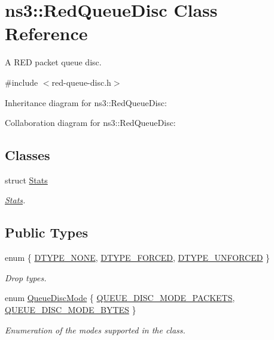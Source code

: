 \hypertarget{classns3_1_1RedQueueDisc}{}\section{ns3\+:\+:Red\+Queue\+Disc Class Reference}
\label{classns3_1_1RedQueueDisc}


A R\+ED packet queue disc.  




{\ttfamily \#include $<$red-\/queue-\/disc.\+h$>$}



Inheritance diagram for ns3\+:\+:Red\+Queue\+Disc\+:


Collaboration diagram for ns3\+:\+:Red\+Queue\+Disc\+:
\subsection*{Classes}
\begin{DoxyCompactItemize}
\item 
struct \hyperlink{structns3_1_1RedQueueDisc_1_1Stats}{Stats}
\begin{DoxyCompactList}\small\item\em \hyperlink{structns3_1_1RedQueueDisc_1_1Stats}{Stats}. \end{DoxyCompactList}\end{DoxyCompactItemize}
\subsection*{Public Types}
\begin{DoxyCompactItemize}
\item 
enum \{ \hyperlink{classns3_1_1RedQueueDisc_a9599a29f6ed3cfc742e7b1c6acd81b0ca875c18e83b2c08e443231f98a46f104c}{D\+T\+Y\+P\+E\+\_\+\+N\+O\+NE}, 
\hyperlink{classns3_1_1RedQueueDisc_a9599a29f6ed3cfc742e7b1c6acd81b0ca65211b6708c279be68d252f83012f2a9}{D\+T\+Y\+P\+E\+\_\+\+F\+O\+R\+C\+ED}, 
\hyperlink{classns3_1_1RedQueueDisc_a9599a29f6ed3cfc742e7b1c6acd81b0ca3facf8866765dbac0549784f2dbee8c3}{D\+T\+Y\+P\+E\+\_\+\+U\+N\+F\+O\+R\+C\+ED}
 \}\begin{DoxyCompactList}\small\item\em Drop types. \end{DoxyCompactList}
\item 
enum \hyperlink{classns3_1_1RedQueueDisc_addca87c9127669da12f19adfe7d14a30}{Queue\+Disc\+Mode} \{ \hyperlink{classns3_1_1RedQueueDisc_addca87c9127669da12f19adfe7d14a30a116c76aa54c1388fc5c2d75cebf577d3}{Q\+U\+E\+U\+E\+\_\+\+D\+I\+S\+C\+\_\+\+M\+O\+D\+E\+\_\+\+P\+A\+C\+K\+E\+TS}, 
\hyperlink{classns3_1_1RedQueueDisc_addca87c9127669da12f19adfe7d14a30a2f30850f8c1dcf5ee511e65d810031e8}{Q\+U\+E\+U\+E\+\_\+\+D\+I\+S\+C\+\_\+\+M\+O\+D\+E\+\_\+\+B\+Y\+T\+ES}
 \}\begin{DoxyCompactList}\small\item\em Enumeration of the modes supported in the class. \end{DoxyCompactList}
\end{DoxyCompactItemize}
